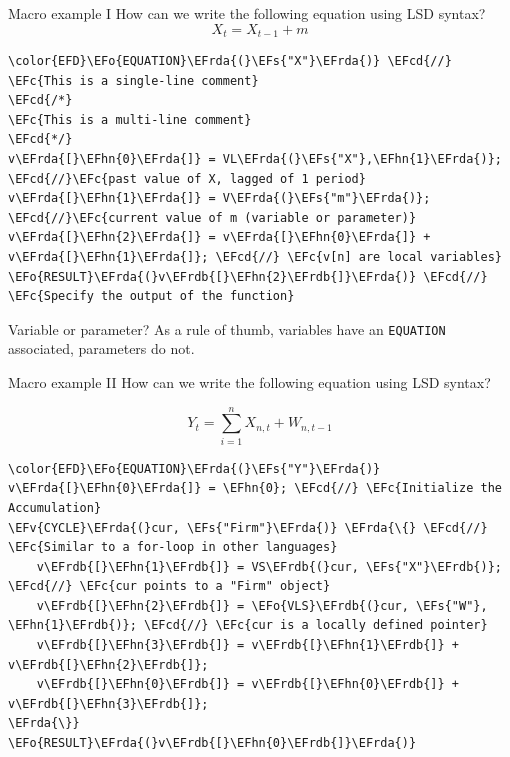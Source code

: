 \documentclass[bigger,aspectratio=169]{beamer}
\newcommand{\EFc}[1]{\textcolor{EFc}{#1}} %
\newcommand{\EFcd}[1]{\textcolor{EFcd}{#1}} %
\newcommand{\EFs}[1]{\textcolor{EFs}{#1}} %
\newcommand{\EFv}[1]{\textcolor{EFv}{#1}} %
\newcommand{\EFo}[1]{\textcolor{EFo}{#1}} %
\newcommand{\EFhn}[1]{\textcolor{EFhn}{\textbf{#1}}} %
\newcommand{\EFrda}[1]{\textcolor{EFrda}{#1}} %
\newcommand{\EFrdb}[1]{\textcolor{EFrdb}{#1}} %
\begin{document}
\begin{frame}[label={sec:orgb6f7d54},fragile]{Macro example I}
 How can we write the following equation using LSD syntax?
\[X_{t} = X_{t-1} + m\]
\begin{Code}
\begin{Verbatim}
\color{EFD}\EFo{EQUATION}\EFrda{(}\EFs{"X"}\EFrda{)} \EFcd{//} \EFc{This is a single-line comment}
\EFcd{/*}
\EFc{This is a multi-line comment}
\EFcd{*/}
v\EFrda{[}\EFhn{0}\EFrda{]} = VL\EFrda{(}\EFs{"X"},\EFhn{1}\EFrda{)}; \EFcd{//}\EFc{past value of X, lagged of 1 period}
v\EFrda{[}\EFhn{1}\EFrda{]} = V\EFrda{(}\EFs{"m"}\EFrda{)}; \EFcd{//}\EFc{current value of m (variable or parameter)}
v\EFrda{[}\EFhn{2}\EFrda{]} = v\EFrda{[}\EFhn{0}\EFrda{]} + v\EFrda{[}\EFhn{1}\EFrda{]}; \EFcd{//} \EFc{v[n] are local variables}
\EFo{RESULT}\EFrda{(}v\EFrdb{[}\EFhn{2}\EFrdb{]}\EFrda{)} \EFcd{//} \EFc{Specify the output of the function}
\end{Verbatim}
\end{Code}
\begin{block}{Variable or parameter?}
As a rule of thumb, variables have an \texttt{EQUATION} associated, parameters do not.
\end{block}
\end{frame}
\begin{frame}[label={sec:org6d4c0b4},fragile]{Macro example II}
 How can we write the following equation using LSD syntax?

\[Y_{t} = \sum_{i=1}^{n} X_{n,t} + W_{n,t-1}\]



\begin{Code}
\begin{Verbatim}
\color{EFD}\EFo{EQUATION}\EFrda{(}\EFs{"Y"}\EFrda{)}
v\EFrda{[}\EFhn{0}\EFrda{]} = \EFhn{0}; \EFcd{//} \EFc{Initialize the Accumulation}
\EFv{CYCLE}\EFrda{(}cur, \EFs{"Firm"}\EFrda{)} \EFrda{\{} \EFcd{//} \EFc{Similar to a for-loop in other languages}
    v\EFrdb{[}\EFhn{1}\EFrdb{]} = VS\EFrdb{(}cur, \EFs{"X"}\EFrdb{)}; \EFcd{//} \EFc{cur points to a "Firm" object}
    v\EFrdb{[}\EFhn{2}\EFrdb{]} = \EFo{VLS}\EFrdb{(}cur, \EFs{"W"}, \EFhn{1}\EFrdb{)}; \EFcd{//} \EFc{cur is a locally defined pointer}
    v\EFrdb{[}\EFhn{3}\EFrdb{]} = v\EFrdb{[}\EFhn{1}\EFrdb{]} + v\EFrdb{[}\EFhn{2}\EFrdb{]};
    v\EFrdb{[}\EFhn{0}\EFrdb{]} = v\EFrdb{[}\EFhn{0}\EFrdb{]} + v\EFrdb{[}\EFhn{3}\EFrdb{]};
\EFrda{\}}
\EFo{RESULT}\EFrda{(}v\EFrdb{[}\EFhn{0}\EFrdb{]}\EFrda{)}
\end{Verbatim}
\end{Code}
\end{frame}
\end{document}
